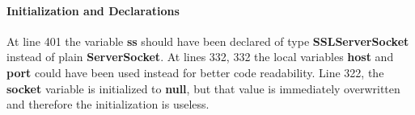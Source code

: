 \paragraph{Initialization and Declarations}
\begin{itemize}
		At line 401 the variable \textbf{ss} should have been declared of type \textbf{SSLServerSocket} instead of plain \textbf{ServerSocket}.
		At lines 332, 332 the local variables \textbf{host} and \textbf{port} could have been used instead for better code readability.
		Line 322, the \textbf{socket} variable is initialized to \textbf{null}, but that value is immediately overwritten and therefore the initialization is useless.
\end{itemize}
%
%
%
%
